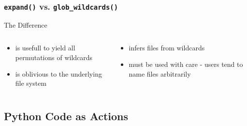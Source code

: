 \begin{frame}[fragile]
  \frametitle{\texttt{expand()} vs. \texttt{glob\_wildcards()}}
  \begin{exampleblock}{The Difference}
    \begin{columns}
      \begin{column}{0.45\textwidth}
        \begin{itemize}
         \item {} is usefull to yield all permutations of wildcards
         \item {} is oblivious to the underlying file system
        \end{itemize}

      \end{column}
      \begin{column}{0.45\textwidth}
        \begin{itemize}
         \item {} infers files from wildcards
         \item {} must be used with care - users tend to name files arbitrarily
        \end{itemize}

      \end{column}
    \end{columns}
  \end{exampleblock}
\end{frame}

\subsection{Python Code as Actions}

